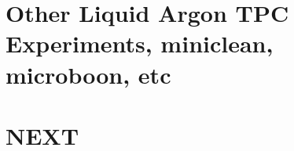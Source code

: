 \subsection{}
\section{Other Liquid Argon TPC Experiments, miniclean, microboon, etc}
\subsection{}
\subsection{}
\section{NEXT}
\subsection{}
\subsection{}
